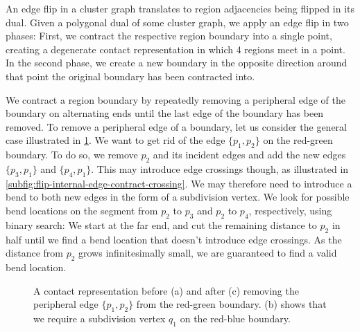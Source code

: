 An edge flip in a cluster graph translates to region adjacencies being flipped in its dual. Given a polygonal dual of some cluster graph, we apply an edge flip in two phases: First, we contract the respective region boundary into a single point, creating a degenerate contact representation in which 4 regions meet in a point. In the second phase, we create a new boundary in the opposite direction around that point the original boundary has been contracted into.

We contract a region boundary by repeatedly removing a peripheral edge of the boundary on alternating ends until the last edge of the boundary has been removed. To remove a peripheral edge of a boundary, let us consider the general case illustrated in \cref{fig:flip-internal-edge-contract}. We want to get rid of the edge $\{p_1,p_2\}$ on the red-green boundary. To do so, we  remove $p_2$ and its incident edges and add the new edges $\{p_3,p_1\}$ and $\{p_4,p_1\}$. This may introduce edge crossings though, as illustrated in \cref{subfig:flip-internal-edge-contract-crossing}. We may therefore need to introduce a bend to both new edges in the form of a subdivision vertex. We look for possible bend locations on the segment from $p_2$ to $p_3$ and $p_2$ to $p_4$, respectively, using binary search: We start at the far end, and cut the remaining distance to $p_2$ in half until we find a bend location that doesn't introduce edge crossings. As the distance from $p_2$ grows infinitesimally small, we are guaranteed to find a valid bend location.

\begin{figure}[H]
	\centering
	\quad
	\quad
	\caption{A contact representation before (a) and after (c) removing the peripheral edge $\{p_1,p_2\}$ from the red-green boundary. (b) shows that we require a subdivision vertex $q_1$ on the red-blue boundary.}
	\label{fig:flip-internal-edge-contract}
\end{figure}

